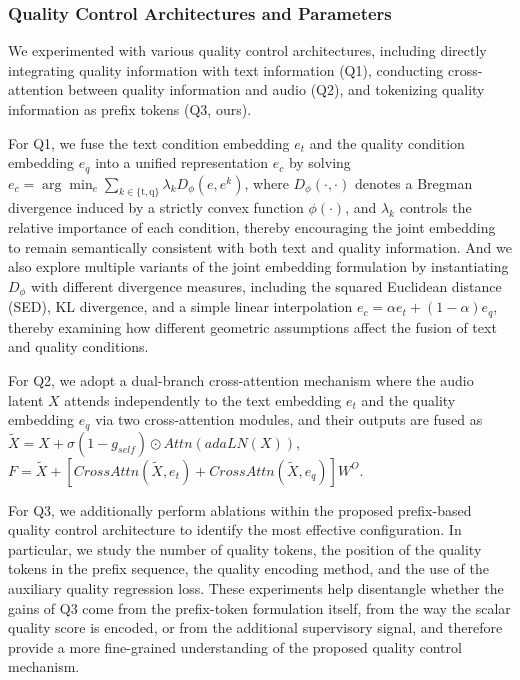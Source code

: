 \documentclass[lettersize,journal]{IEEEtran}
\begin{document}
\subsubsection{Quality Control Architectures and Parameters}
We experimented with various quality control architectures, including directly integrating quality information with text information (Q1), conducting cross-attention between quality information and audio (Q2), and tokenizing quality information as prefix tokens (Q3, ours). 

For Q1, we fuse the text condition embedding $e_t$ and the quality condition embedding $e_q$ into a unified representation $e_c$ by solving $e_c=\arg\min_{e}\sum_{k\in\{\mathrm{t},\mathrm{q}\}}\lambda_k D_\phi(e,e^k)$, where $D_\phi(\cdot,\cdot)$ denotes a Bregman divergence induced by a strictly convex function $\phi(\cdot)$, and $\lambda_k$ controls the relative importance of each condition, thereby encouraging the joint embedding to remain semantically consistent with both text and quality information. And we also explore multiple variants of the joint embedding formulation by instantiating $D_\phi$ with different divergence measures, including the squared Euclidean distance (SED), KL divergence, and a simple linear interpolation $e_{c}=\alpha e_{t}+(1-\alpha)e_{q}$, thereby examining how different geometric assumptions affect the fusion of text and quality conditions.

For Q2, we adopt a dual-branch cross-attention mechanism where the audio latent $\mathit{X}$ attends independently to the text embedding $e_t$ and the quality embedding $e_q$ via two cross-attention modules, and their outputs are fused as $\tilde{\mathit{X}}=\mathit{X}+\sigma(1-\mathit{g}_{\mathit{self}})\odot\mathit{Attn}(\mathit{adaLN}(\mathit{X}))$, $\mathit{F}=\tilde{\mathit{X}}+[\mathit{CrossAttn}(\tilde{\mathit{X}},e_t)+\mathit{CrossAttn}(\tilde{\mathit{X}},e_q)]\mathit{W}^O$.

For Q3, we additionally perform ablations within the proposed prefix-based quality control architecture to identify the most effective configuration. In particular, we study the number of quality tokens, the position of the quality tokens in the prefix sequence, the quality encoding method, and the use of the auxiliary quality regression loss. These experiments help disentangle whether the gains of Q3 come from the prefix-token formulation itself, from the way the scalar quality score is encoded, or from the additional supervisory signal, and therefore provide a more fine-grained understanding of the proposed quality control mechanism.
\end{document}
